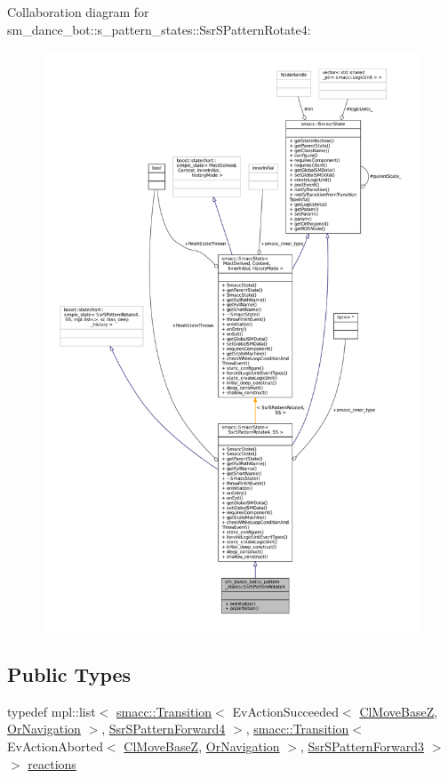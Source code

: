 Collaboration diagram for sm\+\_\+dance\+\_\+bot\+:\+:s\+\_\+pattern\+\_\+states\+:\+:Ssr\+S\+Pattern\+Rotate4\+:
\nopagebreak
\begin{figure}[H]
\begin{center}
\leavevmode
\includegraphics[width=350pt]{structsm__dance__bot_1_1s__pattern__states_1_1SsrSPatternRotate4__coll__graph}
\end{center}
\end{figure}
\subsection*{Public Types}
\begin{DoxyCompactItemize}
\item 
typedef mpl\+::list$<$ \hyperlink{classsmacc_1_1Transition}{smacc\+::\+Transition}$<$ Ev\+Action\+Succeeded$<$ \hyperlink{classmove__base__z__client_1_1ClMoveBaseZ}{Cl\+Move\+BaseZ}, \hyperlink{classsm__dance__bot_1_1OrNavigation}{Or\+Navigation} $>$, \hyperlink{structsm__dance__bot_1_1s__pattern__states_1_1SsrSPatternForward4}{Ssr\+S\+Pattern\+Forward4} $>$, \hyperlink{classsmacc_1_1Transition}{smacc\+::\+Transition}$<$ Ev\+Action\+Aborted$<$ \hyperlink{classmove__base__z__client_1_1ClMoveBaseZ}{Cl\+Move\+BaseZ}, \hyperlink{classsm__dance__bot_1_1OrNavigation}{Or\+Navigation} $>$, \hyperlink{structsm__dance__bot_1_1s__pattern__states_1_1SsrSPatternForward3}{Ssr\+S\+Pattern\+Forward3} $>$ $>$ \hyperlink{structsm__dance__bot_1_1s__pattern__states_1_1SsrSPatternRotate4_a7e2786e660d6435b1d2c699b4d231b1b}{reactions}
\end{DoxyCompactItemize}
